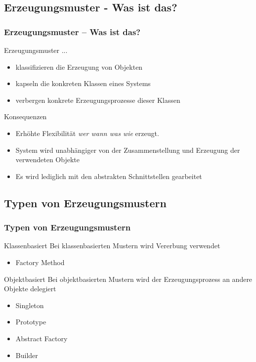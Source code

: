 \subsection{Erzeugungsmuster - Was ist das?}
\begin{frame}
	\frametitle{Erzeugungsmuster -- Was ist das?}
	\begin{block}{Erzeugungsmuster ...}
	\begin{itemize}
		\item klassifizieren die Erzeugung von Objekten
		\item kapseln die konkreten Klassen eines Systems
		\item verbergen konkrete Erzeugungsprozesse dieser Klassen	
	\end{itemize}
	\end{block}	
	\begin{block}{Konsequenzen}
	\begin{itemize}
		\item Erhöhte Flexibilität \textit{wer wann was wie} erzeugt.
		\item System wird unabhängiger von der Zusammenstellung und Erzeugung der verwendeten Objekte
		\item Es wird lediglich mit den abstrakten Schnittstellen gearbeitet
	\end{itemize}
	\end{block}	
\end{frame}

\subsection{Typen von Erzeugungsmustern}
\begin{frame}
	\frametitle{Typen von Erzeugungsmustern}
	\begin{block}{Klassenbasiert}
		Bei klassenbasierten Mustern wird Vererbung verwendet
		\begin{itemize}
			\item Factory Method
		\end{itemize} 	
	\end{block}

	\begin{block}{Objektbasiert}
		Bei objektbasierten Mustern wird der Erzeugungsprozess an andere Objekte delegiert
				\begin{itemize}
					\item \alert<2-> {Singleton}
					\item \alert<2-> {Prototype}
					\item \alert<2-> {Abstract Factory}
					\item Builder				
				\end{itemize}	
	\end{block}
\end{frame}